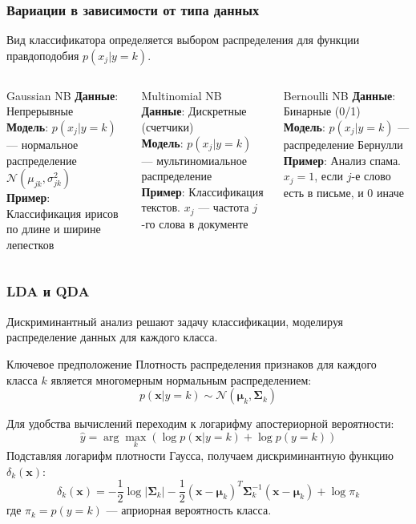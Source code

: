 \documentclass[notheorems, handout]{beamer}
\newcommand{\vect}[1]{\mathbf{#1}}
\newcommand{\matr}[1]{\boldsymbol{#1}}
\begin{document}
\begin{frame}
  \frametitle{Вариации в зависимости от типа данных}
  Вид классификатора определяется выбором распределения для функции
  правдоподобия $p(x_j|y=k)$.

  \begin{columns}[T]
    \begin{block}{Gaussian NB}
      \textbf{Данные}: Непрерывные\\
      \textbf{Модель}: $p(x_j|y=k)$ --- нормальное распределение
      $\mathcal{N}(\mu_{jk}, \sigma_{jk}^2)$\\
      \textbf{Пример}: Классификация ирисов по длине и ширине лепестков
    \end{block}

    \begin{block}{Multinomial NB}
      \textbf{Данные}: Дискретные (счетчики)\\
      \textbf{Модель}: $p(x_j|y=k)$ --- мультиномиальное распределение\\
      \textbf{Пример}: Классификация текстов. $x_j$ --- частота
      $j$-го слова в документе
    \end{block}

    \begin{block}{Bernoulli NB}
      \textbf{Данные}: Бинарные (0/1)\\
      \textbf{Модель}: $p(x_j|y=k)$ --- распределение Бернулли\\
      \textbf{Пример}: Анализ спама. $x_j=1$, если $j$-е слово есть в
      письме, и $0$ иначе
    \end{block}
  \end{columns}
\end{frame}

\begin{frame}
  \frametitle{LDA и QDA}
  Дискриминантный анализ  решают задачу классификации, моделируя
  распределение данных для каждого класса.
  \begin{block}{Ключевое предположение}
    Плотность распределения признаков для каждого класса $k$ является
    многомерным нормальным распределением:
    $$ p(\vect{x}|y=k) \sim \mathcal{N}(\matr{\mu}_k, \matr{\Sigma}_k) $$
  \end{block}
  Для удобства вычислений переходим к логарифму апостериорной вероятности:
  $$ \hat{y} = \arg\max_k \left( \log p(\vect{x}|y=k) + \log p(y=k) \right) $$
  Подставляя логарифм плотности Гаусса, получаем дискриминантную
  функцию $\delta_k(\vect{x})$:
  $$ \delta_k(\vect{x}) = -\frac{1}{2}\log|\matr{\Sigma}_k| -
  \frac{1}{2}(\vect{x}-\matr{\mu}_k)^T\matr{\Sigma}_k^{-1}(\vect{x}-\matr{\mu}_k)
  + \log \pi_k $$
  где $\pi_k = p(y=k)$ --- априорная вероятность класса.
\end{frame}
\end{document}
